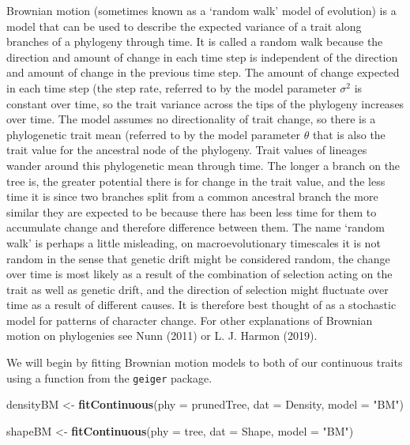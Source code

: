 \documentclass[]{article}
\newenvironment{Shaded}{\begin{snugshade}}{\end{snugshade}}
\newcommand{\KeywordTok}[1]{\textcolor[rgb]{0.13,0.29,0.53}{\textbf{#1}}}
\newcommand{\DataTypeTok}[1]{\textcolor[rgb]{0.13,0.29,0.53}{#1}}
\newcommand{\StringTok}[1]{\textcolor[rgb]{0.31,0.60,0.02}{#1}}
\newcommand{\NormalTok}[1]{#1}
\begin{document}
Brownian motion (sometimes known as a `random walk' model of evolution)
is a model that can be used to describe the expected variance of a trait
along branches of a phylogeny through time. It is called a random walk
because the direction and amount of change in each time step is
independent of the direction and amount of change in the previous time
step. The amount of change expected in each time step (the step rate,
referred to by the model parameter \(\sigma^{2}\) is constant over time,
so the trait variance across the tips of the phylogeny increases over
time. The model assumes no directionality of trait change, so there is a
phylogenetic trait mean (referred to by the model parameter \(\theta\)
that is also the trait value for the ancestral node of the phylogeny.
Trait values of lineages wander around this phylogenetic mean through
time. The longer a branch on the tree is, the greater potential there is
for change in the trait value, and the less time it is since two
branches split from a common ancestral branch the more similar they are
expected to be because there has been less time for them to accumulate
change and therefore difference between them. The name `random walk' is
perhaps a little misleading, on macroevolutionary timescales it is not
random in the sense that genetic drift might be considered random, the
change over time is most likely as a result of the combination of
selection acting on the trait as well as genetic drift, and the
direction of selection might fluctuate over time as a result of
different causes. It is therefore best thought of as a stochastic model
for patterns of character change. For other explanations of Brownian
motion on phylogenies see Nunn (2011) or L. J. Harmon (2019).

We will begin by fitting Brownian motion models to both of our
continuous traits using a function from the \texttt{geiger} package.

\begin{Shaded}
\begin{Highlighting}[]
\NormalTok{densityBM <-}\StringTok{ }\KeywordTok{fitContinuous}\NormalTok{(}\DataTypeTok{phy =}\NormalTok{ prunedTree, }
                           \DataTypeTok{dat =}\NormalTok{ Density, }\DataTypeTok{model =} \StringTok{"BM"}\NormalTok{)}

\NormalTok{shapeBM <-}\StringTok{ }\KeywordTok{fitContinuous}\NormalTok{(}\DataTypeTok{phy =}\NormalTok{ tree, }
                         \DataTypeTok{dat =}\NormalTok{ Shape, }\DataTypeTok{model =} \StringTok{"BM"}\NormalTok{)}
\end{Highlighting}
\end{Shaded}
\end{document}
